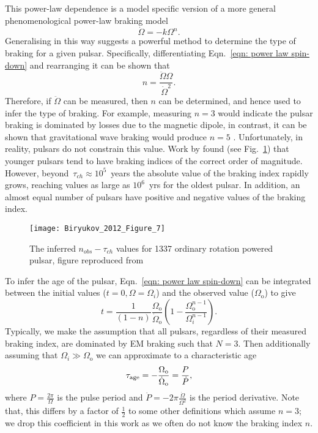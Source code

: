 This power-law dependence is a model specific version of a more general
phenomenological power-law braking model
\begin{equation}
    \dot{\Omega} = -k \Omega^{n}.
    \label{eqn: power law spin-down}
\end{equation}
Generalising in this way suggests a powerful method to determine the type of
braking for a given pulsar. Specifically, differentiating Eqn.~\eqref{eqn: power law spin-down}
and rearranging it can be shown that
\begin{equation}
    n = \frac{\ddot{\Omega}\Omega}{\dot{\Omega}^{2}}.
    \label{eqn: measured braking index}
\end{equation}
Therefore, if $\ddot{\Omega}$ can be measured, then $n$ can be determined, and
hence used to infer the type of braking. For example, measuring $n=3$ would
indicate the pulsar braking is dominated by losses due to the magnetic dipole,
in contrast, it can be shown that gravitational wave braking would produce
$n=5$ \citep{Shapiro83}. Unfortunately, in reality, pulsars do not constrain this
value. Work by \citet{Biryukov2012} found (see Fig.~\ref{fig: biryukov}) that
younger pulsars tend to have braking indices of the correct order of
magnitude. However, beyond~$\tau_{ch}\approx10^{5}$~years
the absolute value of the braking index rapidly grows,
reaching values as large as $10^{6}$~yrs for the oldest pulsar. In addition, an
almost equal number of pulsars have positive and negative values of the braking
index.
\begin{figure}[htb]
\centering
\texttt{[image: Biryukov\_2012\_Figure\_7]}
\caption{The inferred $n_{obs}-\tau_{ch}$ values for 1337 ordinary rotation
powered pulsar, figure reproduced from \citet{Biryukov2012}}
\label{fig: biryukov}
\end{figure}

To infer the age of the pulsar, Eqn.~\eqref{eqn: power law spin-down} can
be integrated between the initial values ($t=0, \Omega=\Omega_{i}$) and the
observed value ($\Omega_{\mathrm{o}}$) to give
\begin{equation}
    t = \frac{1}{(1-n)} \frac{\Omega_{\mathrm{o}}}{\dot\Omega_{\mathrm{o}}} 
        \left(1 - \frac{\Omega_{\mathrm{o}}^{n-1}}{\Omega_{i}^{n-1}}\right).
\label{eqn: characteristic age}
\end{equation}
Typically, we make the assumption that all
pulsars, regardless of their measured braking index, are dominated by EM braking
such that $N=3$. Then additionally assuming that $\Omega_{i} \gg
\Omega_{\mathrm{o}}$ we can approximate to a characteristic age
\begin{equation}
    \tau_{\mathrm{age}} = -\frac{\Omega_{\mathrm{o}}}{\dot\Omega_{\mathrm{o}}}
         = \frac{P}{\dot{P}},
\label{eqn: tauAge definition}
\end{equation}
where $P=\frac{2\pi}{\Omega}$ is the pulse period and
$\dot{P}=-2\pi\frac{\dot{\Omega}}{\Omega^{2}}$ is the period derivative.  Note
that, this differs by a factor of $\frac{1}{2}$ to some other definitions which
assume $n=3$; we drop this coefficient in this work as we often do not know the
braking index $n$.

